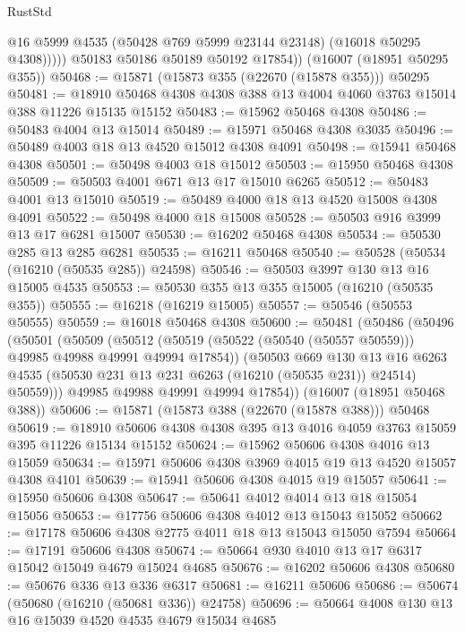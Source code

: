 \begin{lexlean}{RustStd}
\begin{coremodule}
                @16
                @5999
                @4535
                (@50428 @769 @5999 @23144 @23148)
                (@16018 @50295 @4308)))))
        @50183
        @50186
        @50189
        @50192
        @17854))
    (@16007 (@18951 @50295 @355))
@50468 := @15871 (@15873 @355 (@22670 (@15878 @355))) @50295
@50481 := @18910 @50468 @4308 @4308 @388 @13 @4004 @4060 @3763 @15014 @388 @11226 @15135 @15152
@50483 := @15962 @50468 @4308
@50486 := @50483 @4004 @13 @15014
@50489 := @15971 @50468 @4308 @3035
@50496 := @50489 @4003 @18 @13 @4520 @15012 @4308 @4091
@50498 := @15941 @50468 @4308
@50501 := @50498 @4003 @18 @15012
@50503 := @15950 @50468 @4308
@50509 := @50503 @4001 @671 @13 @17 @15010 @6265
@50512 := @50483 @4001 @13 @15010
@50519 := @50489 @4000 @18 @13 @4520 @15008 @4308 @4091
@50522 := @50498 @4000 @18 @15008
@50528 := @50503 @916 @3999 @13 @17 @6281 @15007
@50530 := @16202 @50468 @4308
@50534 := @50530 @285 @13 @285 @6281
@50535 := @16211 @50468
@50540 := @50528 (@50534 (@16210 (@50535 @285)) @24598)
@50546 := @50503 @3997 @130 @13 @16 @15005 @4535
@50553 := @50530 @355 @13 @355 @15005 (@16210 (@50535 @355))
@50555 := @16218 (@16219 @15005)
@50557 := @50546 (@50553 @50555)
@50559 := @16018 @50468 @4308
@50600 := @50481
    (@50486
      (@50496
        (@50501
          (@50509
            (@50512 (@50519 (@50522 (@50540 (@50557 @50559))) @49985 @49988 @49991 @49994 @17854))
            (@50503
              @669
              @130
              @13
              @16
              @6263
              @4535
              (@50530 @231 @13 @231 @6263 (@16210 (@50535 @231)) @24514)
              @50559)))
        @49985
        @49988
        @49991
        @49994
        @17854))
    (@16007 (@18951 @50468 @388))
@50606 := @15871 (@15873 @388 (@22670 (@15878 @388))) @50468
@50619 := @18910 @50606 @4308 @4308 @395 @13 @4016 @4059 @3763 @15059 @395 @11226 @15134 @15152
@50624 := @15962 @50606 @4308 @4016 @13 @15059
@50634 := @15971 @50606 @4308 @3969 @4015 @19 @13 @4520 @15057 @4308 @4101
@50639 := @15941 @50606 @4308 @4015 @19 @15057
@50641 := @15950 @50606 @4308
@50647 := @50641 @4012 @4014 @13 @18 @15054 @15056
@50653 := @17756 @50606 @4308 @4012 @13 @15043 @15052
@50662 := @17178 @50606 @4308 @2775 @4011 @18 @13 @15043 @15050 @7594
@50664 := @17191 @50606 @4308
@50674 := @50664 @930 @4010 @13 @17 @6317 @15042 @15049 @4679 @15024 @4685
@50676 := @16202 @50606 @4308
@50680 := @50676 @336 @13 @336 @6317
@50681 := @16211 @50606
@50686 := @50674 (@50680 (@16210 (@50681 @336)) @24758)
@50696 := @50664 @4008 @130 @13 @16 @15039 @4520 @4535 @4679 @15034 @4685

\end{coremodule}
\end{lexlean}
